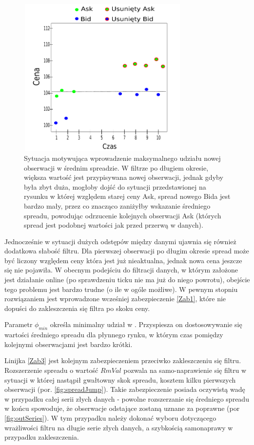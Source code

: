 \documentclass[a4paper,12pt,openany, DIV=calc, headsepline]{scrbook}
\begin{document}
\begin{figure}[h]
  \centering
  \includegraphics[width=85mm, height=80mm]{wykresy/longTime}
  \caption{Sytuacja motywująca wprowadzenie maksymalnego udziału nowej obserwacji w średnim spreadzie. W filtrze po długiem okresie, większa wartość jest przypisywana nowej obserwacji, jednak gdyby była zbyt duża, mogłoby dojść do sytuacji przedstawionej na rysunku w której względem starej ceny Ask, spread nowego Bida jest bardzo mały, przez co znacząco zaniżyłby wskazanie średniego spreadu, powodując odrzucenie kolejnych obserwacji Ask (których spread jest podobnej wartości jak przed przerwą w danych).}
  \label{fig:longTime}
\end{figure}

Jednocześnie w sytuacji dużych odstępów między danymi ujawnia się również dodatkowa słabość filtru. Dla pierwszej obserwacji po długim okresie spread może być liczony względem ceny która jest już nieaktualna, jednak nowa cena jeszcze się nie pojawiła. W obecnym podejściu do filtracji danych, w którym założone jest działanie online (po sprawdzeniu ticku nie ma już do niego powrotu), obejście tego problemu jest bardzo trudne (o ile w ogóle możliwe). W pewnym stopniu rozwiązaniem jest wprowadzone wcześniej zabezpieczenie \ref{Zab1}, które nie dopuści do zakleszczenia się filtra po skoku ceny.

Parametr $\phi_{min}$ określa minimalny udział \Spt w \MSpn. Przyspiesza on dostosowywanie się wartości średniego spreadu dla płynnego rynku, w którym czas pomiędzy kolejnymi obserwacjami jest bardzo krótki.

Linijka \ref{Zab3} jest kolejnym zabezpieczeniem przeciwko zakleszczeniu się filtru. Rozszerzenie spreadu o wartość $RmVal$ pozwala na samo-naprawienie się filtru w sytuacji w której nastąpił gwałtowny skok spreadu, kosztem kilku pierwszych obserwacji (por. \ref{fig:spreadJump}). Takie zabezpieczenie posiada oczywistą wadę w przypadku całej serii złych danych - powolne rozszerzanie się średniego spreadu w końcu spowoduje, że obserwacje odstające zostaną uznane za poprawne (por \ref{fig:outSeries}). W tym przypadku należy dokonać wyboru dotyczącego wrażliwości filtru na długie serie złych danych, a szybkością samonaprawy w przypadku zakleszczenia. 
\end{document}

